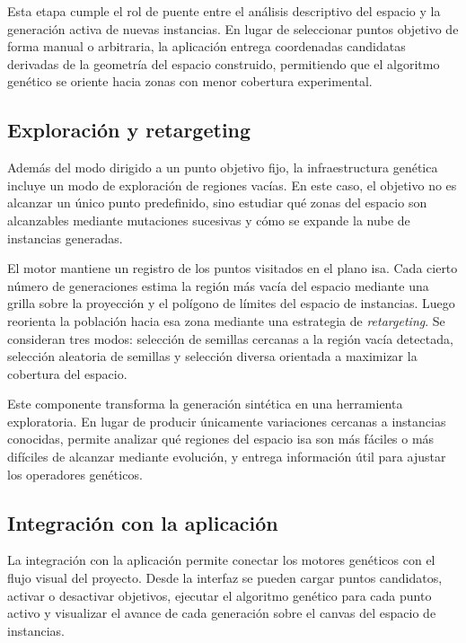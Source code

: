 Esta etapa cumple el rol de puente entre el análisis descriptivo del espacio y la
generación activa de nuevas instancias.
En lugar de seleccionar puntos objetivo de forma manual o arbitraria, la aplicación
entrega coordenadas candidatas derivadas de la geometría del espacio construido,
permitiendo que el algoritmo genético se oriente hacia zonas con menor cobertura
experimental.

\subsection{Exploración y retargeting}
\label{subsec:avance_ga_exploracion_guiada}

Además del modo dirigido a un punto objetivo fijo, la infraestructura genética incluye
un modo de exploración de regiones vacías.
En este caso, el objetivo no es alcanzar un único punto predefinido, sino estudiar qué
zonas del espacio son alcanzables mediante mutaciones sucesivas y cómo se expande la
nube de instancias generadas.

El motor mantiene un registro de los puntos visitados en el plano \acrshort{isa}.
Cada cierto número de generaciones estima la región más vacía del espacio mediante
una grilla sobre la proyección y el polígono de límites del espacio de instancias.
Luego reorienta la población hacia esa zona mediante una estrategia de
\emph{retargeting}.
Se consideran tres modos: selección de semillas cercanas a la región vacía detectada,
selección aleatoria de semillas y selección diversa orientada a maximizar la cobertura
del espacio.

Este componente transforma la generación sintética en una herramienta exploratoria.
En lugar de producir únicamente variaciones cercanas a instancias conocidas, permite
analizar qué regiones del espacio \acrshort{isa} son más fáciles o más difíciles de
alcanzar mediante evolución, y entrega información útil para ajustar los operadores
genéticos.

\newpage
\subsection{Integración con la aplicación}
\label{subsec:avance_ga_aplicacion}

La integración con la aplicación permite conectar los motores genéticos con
el flujo visual del proyecto.
Desde la interfaz se pueden cargar puntos candidatos, activar o desactivar objetivos,
ejecutar el algoritmo genético para cada punto activo y visualizar el avance de cada
generación sobre el canvas del espacio de instancias.

